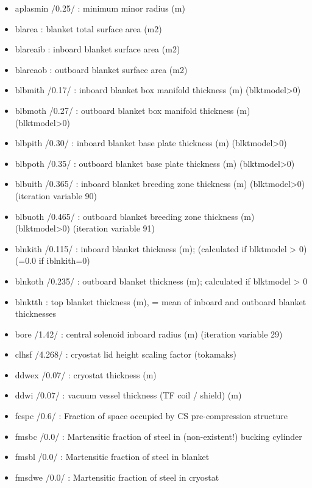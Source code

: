 \documentclass[]{article}
\providecommand{\tightlist}{%
  \setlength{\itemsep}{0pt}\setlength{\parskip}{0pt}}
\begin{document}
\begin{itemize}
\tightlist
\item
  aplasmin /0.25/ : minimum minor radius (m)
\item
  blarea : blanket total surface area (m2)
\item
  blareaib : inboard blanket surface area (m2)
\item
  blareaob : outboard blanket surface area (m2)
\item
  blbmith /0.17/ : inboard blanket box manifold thickness (m)
  (blktmodel\textgreater{}0)
\item
  blbmoth /0.27/ : outboard blanket box manifold thickness (m)
  (blktmodel\textgreater{}0)
\item
  blbpith /0.30/ : inboard blanket base plate thickness (m)
  (blktmodel\textgreater{}0)
\item
  blbpoth /0.35/ : outboard blanket base plate thickness (m)
  (blktmodel\textgreater{}0)
\item
  blbuith /0.365/ : inboard blanket breeding zone thickness (m)
  (blktmodel\textgreater{}0) (iteration variable 90)
\item
  blbuoth /0.465/ : outboard blanket breeding zone thickness (m)
  (blktmodel\textgreater{}0) (iteration variable 91)
\item
  blnkith /0.115/ : inboard blanket thickness (m); (calculated if
  blktmodel \textgreater{} 0) (=0.0 if iblnkith=0)
\item
  blnkoth /0.235/ : outboard blanket thickness (m); calculated if
  blktmodel \textgreater{} 0
\item
  blnktth : top blanket thickness (m), = mean of inboard and outboard
  blanket thicknesses
\item
  bore /1.42/ : central solenoid inboard radius (m) (iteration variable
  29)
\item
  clhsf /4.268/ : cryostat lid height scaling factor (tokamaks)
\item
  ddwex /0.07/ : cryostat thickness (m)
\item
  ddwi /0.07/ : vacuum vessel thickness (TF coil / shield) (m)
\item
  fcspc /0.6/ : Fraction of space occupied by CS pre-compression
  structure
\item
  fmsbc /0.0/ : Martensitic fraction of steel in (non-existent!) bucking
  cylinder
\item
  fmsbl /0.0/ : Martensitic fraction of steel in blanket
\item
  fmsdwe /0.0/ : Martensitic fraction of steel in cryostat

\end{itemize}
\end{document}
